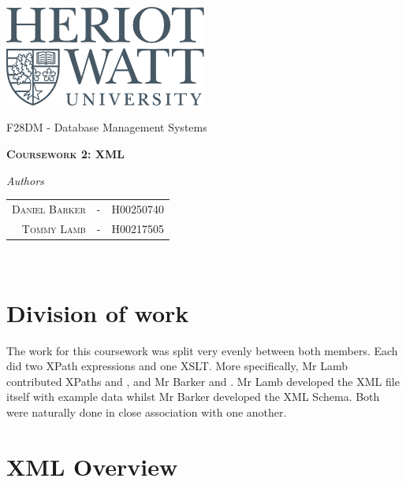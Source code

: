 \documentclass[a4paper, titlepage]{article}
\begin{document}
	\begin{titlepage}
		\thispagestyle{empty}
		{\centering
			\includegraphics[width=0.5\textwidth]{heriot-watt-logo.png}\par\vspace{1cm}
			\vspace{1cm}
			{\LARGE F28DM - Database Management Systems\par}
			\vspace{1.5cm}
			\vspace{1.5cm}
			{\scshape\LARGE\bfseries Coursework 2: XML \par}
			\vspace{5cm}
			
			\textit{Authors}\par
			\begin{tabular}{rcl}
				\\ \textsc{Daniel Barker} & - & H00250740\\
				\textsc{Tommy Lamb} & - & H00217505 \\
			\end{tabular} \\		
		}
	\end{titlepage}
	\pagebreak


\section{Division of work}

The work for this coursework was split very evenly between both members. Each did two XPath expressions and one XSLT. More specifically, Mr Lamb contributed XPaths  and , and Mr Barker  and . Mr Lamb developed the XML file itself with example data whilst Mr Barker developed the XML Schema. Both were naturally done in close association with one another.

\section{XML Overview}
\end{document}
